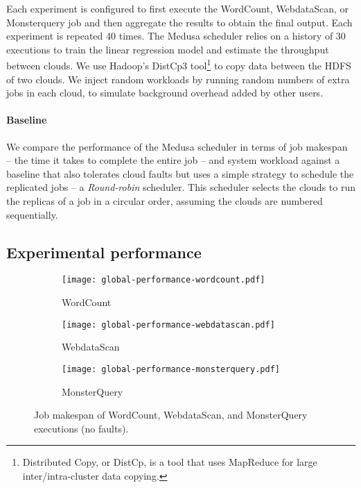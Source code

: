 \documentclass[10pt, conference, compsocconf]{IEEEtran}
\begin{document}
Each experiment is configured to first execute the WordCount, WebdataScan, or Monsterquery job and then aggregate the results to obtain the final output.
Each experiment is repeated 40 times. The Medusa scheduler relies on a history of 30 executions to train the linear regression model and estimate the throughput between clouds.
We use Hadoop's DistCp3 tool\footnote{Distributed Copy, or DistCp, is a tool that uses MapReduce for large inter/intra-cluster data copying.} to copy data between the HDFS of two clouds.
We inject random workloads by running random numbers of extra jobs in each cloud, to simulate background overhead added by other users.

\paragraph{Baseline} We compare the performance of the Medusa scheduler in terms of job makespan -- the time it takes to complete the entire job -- and system workload against a baseline that also tolerates cloud faults but uses a simple strategy to schedule the replicated jobs -- a \textit{Round-robin} scheduler.
This scheduler selects the clouds to run the replicas of a job in a circular order, assuming the clouds are numbered sequentially.



\subsection{Experimental performance}
\label{subset:perf}

\begin{figure*}[t!]

  \begin{subfigure}{0.31\textwidth}
    \texttt{[image: global-performance-wordcount.pdf]}
    \caption{WordCount}
    \label{fig:makespan:performance:trendline:wordcount}
  \end{subfigure}
  \hspace*{\fill} \begin{subfigure}{0.31\textwidth}
    \texttt{[image: global-performance-webdatascan.pdf]}
    \caption{WebdataScan}
    \label{fig:makespan:performance:trendline:webdatascan}
  \end{subfigure}
  \hspace*{\fill} \begin{subfigure}{0.31\textwidth}
    \texttt{[image: global-performance-monsterquery.pdf]}
    \caption{MonsterQuery}
    \label{fig:makespan:performance:trendline:monsterquery}
  \end{subfigure}
  \vspace{.5em}
  \caption{Job makespan of WordCount, WebdataScan, and MonsterQuery executions (no faults).}
  \label{fig:makespan:performance:trendline}
\end{figure*}
\end{document}

